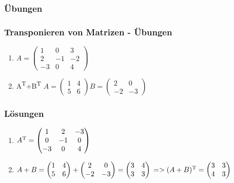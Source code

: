 \subsubsection{Übungen}
\begin{frame}
\frametitle{Transponieren von Matrizen - Übungen}
\begin{enumerate}
\item $A = \begin{pmatrix}
1 & 0 & 3\\
2 & -1 & -2\\
-3 & 0 & 4
\end{pmatrix}$
\item A\textsuperscript{T}+B\textsuperscript{T}
$A = \begin{pmatrix}
1 & 4 \\
5 & 6
\end{pmatrix}
B = \begin{pmatrix}
2 & 0\\
-2 & -3
\end{pmatrix}$
\end{enumerate}
\end{frame}


\subsubsection{Lösungen}
\begin{frame}
\begin{enumerate}
\item $A\textsuperscript{T} = \begin{pmatrix}
1 & 2 & -3\\
0 & -1 & 0\\
-3 & 0 & 4
\end{pmatrix}$
\item $A + B = \begin{pmatrix}
1 & 4\\
5 & 6
\end{pmatrix} + \begin{pmatrix}
2 & 0\\
-2 & -3
\end{pmatrix} = \begin{pmatrix}
3 & 4\\
3 & 3
\end{pmatrix} 
\newline
=> (A+B)\textsuperscript{T} = \begin{pmatrix}
3 & 3\\
4 & 3
\end{pmatrix}$
\end{enumerate}
\end{frame}

